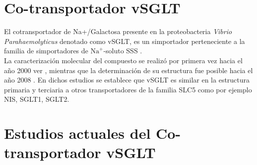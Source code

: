 \section{Co-transportador vSGLT}
El cotransportador de Na+/Galactosa presente en la proteobacteria \textit{Vibrio Parahaemolyticus } denotado como vSGLT, es un simportador perteneciente a la familia de simportadores de $\mathrm{Na}^+$-soluto SSS \cite{SaierJr.quotTheFamilyquot}.\\
La caracterizaci\'{o}n molecular del compuesto se realiz\'{o} por primera vez hacia el a\~{n}o 2000 ver \cite{Turk2000}, mientras que la determinaci\'{o}n de su estructura fue posible hacia el a\~{n}o 2008 \cite{Faham2008}. En dichos estudios se establece que vSGLT es similar en la estructura primaria y terciaria a otros transportadores de la familia SLC5 como por ejemplo NIS, SGLT1, SGLT2.
\section{Estudios actuales del Co-transportador vSGLT}
